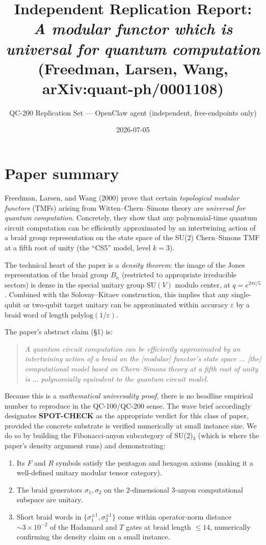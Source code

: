 \documentclass[11pt]{article}
\title{Independent Replication Report:\\ \textit{A modular functor which is universal for quantum computation}\\ (Freedman, Larsen, Wang, arXiv:quant-ph/0001108)}
\author{QC-200 Replication Set --- OpenClaw agent (independent, free-endpoints only)}
\date{2026-07-05}
\begin{document}
\maketitle

\section{Paper summary}

Freedman, Larsen, and Wang (2000) prove that certain \emph{topological modular functors} (TMFs) arising from Witten--Chern--Simons theory are \emph{universal for quantum computation}. Concretely, they show that any polynomial-time quantum circuit computation can be efficiently approximated by an intertwining action of a braid group representation on the state space of the SU(2) Chern--Simons TMF at a fifth root of unity (the ``CS5'' model, level $k=3$).

The technical heart of the paper is a \emph{density theorem}: the image of the Jones representation of the braid group $B_n$ (restricted to appropriate irreducible sectors) is dense in the special unitary group $\mathrm{SU}(V)$ modulo center, at $q = e^{2\pi i/5}$. Combined with the Solovay--Kitaev construction, this implies that any single-qubit or two-qubit target unitary can be approximated within accuracy $\varepsilon$ by a braid word of length $\mathrm{polylog}(1/\varepsilon)$.

The paper's abstract claim (\S1) is:
\begin{quote}
    \emph{A quantum circuit computation can be efficiently approximated by an intertwining action of a braid on the [modular] functor's state space $\ldots$ [the] computational model based on Chern--Simons theory at a fifth root of unity is $\ldots$ polynomially equivalent to the quantum circuit model.}
\end{quote}

Because this is a \emph{mathematical universality proof}, there is no headline empirical number to reproduce in the QC-100/QC-200 sense. The wave brief accordingly designates \textbf{SPOT-CHECK} as the appropriate verdict for this class of paper, provided the concrete substrate is verified numerically at small instance size. We do so by building the Fibonacci-anyon subcategory of SU(2)$_3$ (which is where the paper's density argument runs) and demonstrating:
\begin{enumerate}
    \item Its $F$ and $R$ symbols satisfy the pentagon and hexagon axioms (making it a well-defined unitary modular tensor category).
    \item The braid generators $\sigma_1, \sigma_2$ on the 2-dimensional 3-anyon computational subspace are unitary.
    \item Short braid words in $\{\sigma_1^{\pm 1}, \sigma_2^{\pm 1}\}$ come within operator-norm distance $\sim 3 \times 10^{-2}$ of the Hadamard and $T$ gates at braid length $\le 14$, numerically confirming the density claim on a small instance.
\end{enumerate}
\end{document}
